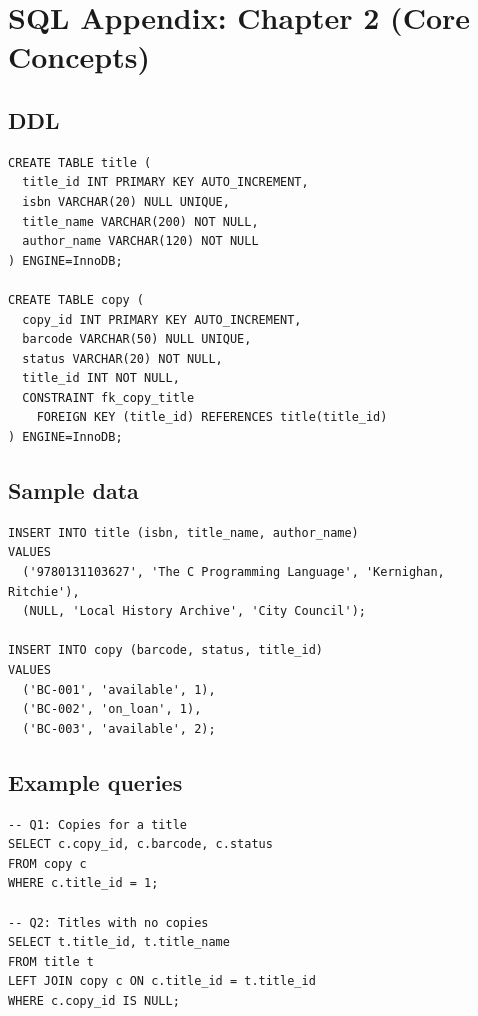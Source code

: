 \chapter{SQL Appendix: Chapter 2 (Core Concepts)}

\section{DDL}
\begin{verbatim}
CREATE TABLE title (
  title_id INT PRIMARY KEY AUTO_INCREMENT,
  isbn VARCHAR(20) NULL UNIQUE,
  title_name VARCHAR(200) NOT NULL,
  author_name VARCHAR(120) NOT NULL
) ENGINE=InnoDB;

CREATE TABLE copy (
  copy_id INT PRIMARY KEY AUTO_INCREMENT,
  barcode VARCHAR(50) NULL UNIQUE,
  status VARCHAR(20) NOT NULL,
  title_id INT NOT NULL,
  CONSTRAINT fk_copy_title
    FOREIGN KEY (title_id) REFERENCES title(title_id)
) ENGINE=InnoDB;
\end{verbatim}

\section{Sample data}
\begin{verbatim}
INSERT INTO title (isbn, title_name, author_name)
VALUES
  ('9780131103627', 'The C Programming Language', 'Kernighan, Ritchie'),
  (NULL, 'Local History Archive', 'City Council');

INSERT INTO copy (barcode, status, title_id)
VALUES
  ('BC-001', 'available', 1),
  ('BC-002', 'on_loan', 1),
  ('BC-003', 'available', 2);
\end{verbatim}

\section{Example queries}
\begin{verbatim}
-- Q1: Copies for a title
SELECT c.copy_id, c.barcode, c.status
FROM copy c
WHERE c.title_id = 1;

-- Q2: Titles with no copies
SELECT t.title_id, t.title_name
FROM title t
LEFT JOIN copy c ON c.title_id = t.title_id
WHERE c.copy_id IS NULL;
\end{verbatim}
